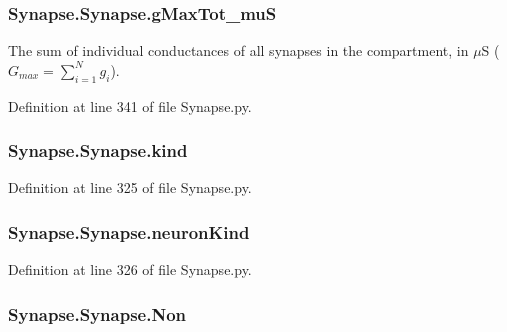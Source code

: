\subsubsection[{\texorpdfstring{g\+Max\+Tot\+\_\+muS}{gMaxTot_muS}}]{\setlength{\rightskip}{0pt plus 5cm}Synapse.\+Synapse.\+g\+Max\+Tot\+\_\+muS}\hypertarget{class_synapse_1_1_synapse_a470750725ecb176e048a973b9dc23ea3}{}\label{class_synapse_1_1_synapse_a470750725ecb176e048a973b9dc23ea3}


The sum of individual conductances of all synapses in the compartment, in $\mu$S ( $G_{max} = \limits\sum_{i=1}^Ng_i$). 



Definition at line 341 of file Synapse.\+py.

\subsubsection[{\texorpdfstring{kind}{kind}}]{\setlength{\rightskip}{0pt plus 5cm}Synapse.\+Synapse.\+kind}\hypertarget{class_synapse_1_1_synapse_aa2ea45450a3ad13cfefcae9fabe6ce15}{}\label{class_synapse_1_1_synapse_aa2ea45450a3ad13cfefcae9fabe6ce15}


Definition at line 325 of file Synapse.\+py.

\subsubsection[{\texorpdfstring{neuron\+Kind}{neuronKind}}]{\setlength{\rightskip}{0pt plus 5cm}Synapse.\+Synapse.\+neuron\+Kind}\hypertarget{class_synapse_1_1_synapse_a031af2fe7be76f9b5f69c087228a1b9a}{}\label{class_synapse_1_1_synapse_a031af2fe7be76f9b5f69c087228a1b9a}


Definition at line 326 of file Synapse.\+py.

\subsubsection[{\texorpdfstring{Non}{Non}}]{\setlength{\rightskip}{0pt plus 5cm}Synapse.\+Synapse.\+Non}\hypertarget{class_synapse_1_1_synapse_af8779bbc2ee2c5ae7747ee5cfbcf112e}{}\label{class_synapse_1_1_synapse_af8779bbc2ee2c5ae7747ee5cfbcf112e}


